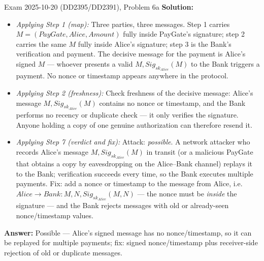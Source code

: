 \documentclass[12pt, a4paper]{article}
\begin{document}
\begin{practicebox}{Exam 2025-10-20 (DD2395/DD2391), Problem 6a}
\textbf{Solution:}
\begin{itemize}
    \item \textit{Applying Step 1 (map):} Three parties, three messages. Step 1 carries $M = (PayGate, Alice, Amount)$ fully inside PayGate's signature; step 2 carries the same $M$ fully inside Alice's signature; step 3 is the Bank's verification and payment. The decisive message for the payment is Alice's signed $M$ --- whoever presents a valid $M, Sig_{sk_{Alice}}(M)$ to the Bank triggers a payment. No nonce or timestamp appears anywhere in the protocol.
    \item \textit{Applying Step 2 (freshness):} Check freshness of the decisive message: Alice's message $M, Sig_{sk_{Alice}}(M)$ contains no nonce or timestamp, and the Bank performs no recency or duplicate check --- it only verifies the signature. Anyone holding a copy of one genuine authorization can therefore resend it.
    \item \textit{Applying Step 7 (verdict and fix):} Attack: \emph{possible}. A network attacker who records Alice's message $M, Sig_{sk_{Alice}}(M)$ in transit (or a malicious PayGate that obtains a copy by eavesdropping on the Alice--Bank channel) replays it to the Bank; verification succeeds every time, so the Bank executes multiple payments. Fix: add a nonce or timestamp to the message from Alice, i.e. $Alice \to Bank : M, N, Sig_{sk_{Alice}}(M, N)$ --- the nonce must be \emph{inside} the signature --- and the Bank rejects messages with old or already-seen nonce/timestamp values.
\end{itemize}
\textbf{Answer:} Possible --- Alice's signed message has no nonce/timestamp, so it can be replayed for multiple payments; fix: signed nonce/timestamp plus receiver-side rejection of old or duplicate messages.
\end{practicebox}
\end{document}
